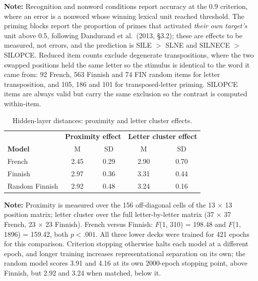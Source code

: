 \begin{table}[htbp]
\vspace{2mm}
\begin{minipage}{0.98\textwidth}
\footnotesize \textbf{Note:} Recognition and nonword conditions report accuracy at the 0.9 criterion, where an error is a nonword whose winning lexical unit reached threshold. The priming blocks report the proportion of primes that activated \emph{their own target's} unit above 0.5, following Dandurand et al.\ (2013, \S3.2); these are effects to be measured, not errors, and the prediction is SILE $>$ SLNE and SILNECE $>$ SILOPCE. Reduced item counts exclude degenerate transpositions, where the two swapped positions held the same letter so the stimulus is identical to the word it came from: 92 French, 563 Finnish and 74 FIN random items for letter transposition, and 105, 186 and 101 for transposed-letter priming. SILOPCE items are always valid but carry the same exclusion so the contrast is computed within-item.
\end{minipage}
\end{table}


\begin{table}[htbp]
\centering
\caption{Hidden-layer distances: proximity and letter cluster effects.}
\label{tab:effects}
\begin{tabular}{|l|cc|cc|}
\hline
 & \multicolumn{2}{c|}{\textbf{Proximity effect}} & \multicolumn{2}{c|}{\textbf{Letter cluster effect}} \\
\textbf{Model} & M & SD & M & SD \\
\hline
French & 2.45 & 0.29 & 2.90 & 0.70 \\
Finnish & 2.97 & 0.36 & 3.31 & 0.44 \\
Random Finnish & 2.92 & 0.48 & 3.24 & 0.16 \\
\hline
\end{tabular}

\vspace{2mm}
\begin{minipage}{0.95\textwidth}
\footnotesize \textbf{Note:} Proximity is measured over the 156 off-diagonal cells of the 13 $\times$ 13 position matrix; letter cluster over the full letter-by-letter matrix (37 $\times$ 37 French, 23 $\times$ 23 Finnish). French versus Finnish: $F$(1, 310) = 198.48 and $F$(1, 1896) = 159.42, both $p < .001$. All three lower decks were trained for 421 epochs for this comparison. Criterion stopping otherwise halts each model at a different epoch, and longer training increases representational separation on its own; the random model scores 3.91 and 4.16 at its own 2000-epoch stopping point, above Finnish, but 2.92 and 3.24 when matched, below it.
\end{minipage}
\end{table}
